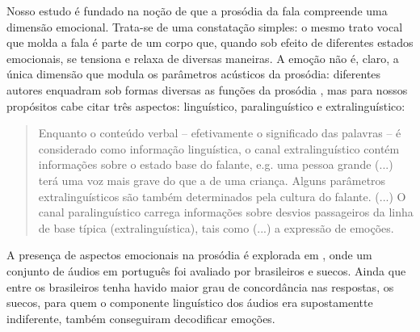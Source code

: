 \documentclass[a4paper]{tufte-handout}
\begin{document}
Nosso estudo é fundado na noção de que a prosódia da fala compreende uma dimensão emocional. Trata-se de uma constatação simples: o mesmo trato vocal que molda a fala é parte de um corpo que, quando sob efeito de diferentes estados emocionais, se tensiona e relaxa de diversas maneiras. A emoção não é, claro, a única dimensão que modula os parâmetros acústicos da prosódia: diferentes autores enquadram sob formas diversas as funções da prosódia \citep{schotz2002linguistic}, mas para nossos propósitos cabe citar três aspectos: linguístico, paralinguístico e extralinguístico: 

\begin{quotation}
    Enquanto o conteúdo verbal -- efetivamente o significado das palavras -- é considerado como informação linguística, o canal extralinguístico contém informações sobre o estado base do falante, e.g. uma pessoa grande (...) terá uma voz mais grave do que a de uma criança. Alguns parâmetros extralinguísticos são também determinados pela cultura do falante. (...) O canal paralinguístico carrega informações sobre desvios passageiros da linha de base típica (extralinguística), tais como (...) a expressão de emoções. 
\end{quotation}

A presença de aspectos emocionais na prosódia é explorada em \citet{SILVA2016}, onde um conjunto de áudios em português foi avaliado por brasileiros e suecos. Ainda que entre os brasileiros tenha havido maior grau de concordância nas respostas, os suecos, para quem o componente linguístico dos áudios era supostamentte indiferente, também conseguiram decodificar emoções.
\end{document}
